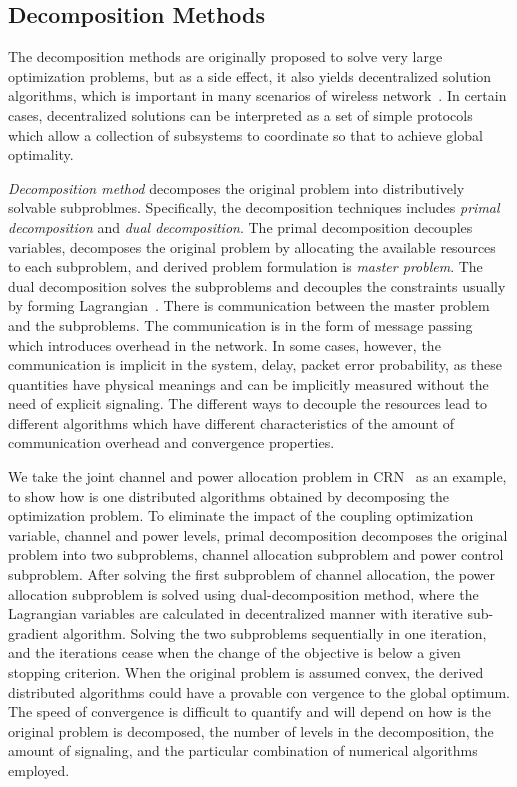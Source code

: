 \subsection{Decomposition Methods}
The decomposition methods are originally proposed to solve very large optimization problems, but as a side effect, it also yields decentralized solution algorithms, which is important in many scenarios of wireless network~\cite{boyd2007notes}. 
In certain cases, decentralized solutions can be interpreted as a set of simple protocols which allow a collection of subsystems to coordinate so that to achieve global optimality.

\textit{Decomposition method} decomposes the original problem into distributively solvable subproblmes.
Specifically, the decomposition techniques includes \textit{primal decomposition} and \textit{dual decomposition}.
The primal decomposition decouples variables, \ie decomposes the original problem by allocating the available resources to each subproblem, and derived problem formulation is \textit{master problem}.
The dual decomposition solves the subproblems and decouples the constraints usually by forming Lagrangian~\cite{Bertsekas_99, Palomar06atutorial}.
There is communication between the master problem and the subproblems.
The communication is in the form of message passing which introduces overhead in the network.
In some cases, however, the communication is implicit in the system, \eg delay, packet error probability, as these quantities have physical meanings and can be implicitly measured without the need of explicit signaling.
The different ways to decouple the resources lead to different algorithms which have different characteristics of the amount of communication overhead and convergence properties.

We take the joint channel and power allocation problem in CRN~\cite{tachwali_opt_bandwidth_power_2013} as an example, to show how is one distributed algorithms obtained by decomposing the optimization problem.
To eliminate the impact of the coupling optimization variable, \ie channel and power levels, primal decomposition decomposes the original problem into two subproblems, channel allocation subproblem and power control subproblem. 
After solving the first subproblem of channel allocation, the power allocation subproblem is solved using dual-decomposition method, where the Lagrangian variables are calculated in decentralized manner with iterative sub-gradient algorithm.
Solving the two subproblems sequentially in one iteration, and the iterations cease when the change of the objective is below a given stopping criterion.
When the original problem is assumed convex, the derived distributed algorithms could have a provable con vergence to the global optimum.
The speed of convergence is difficult to quantify and will depend on how is the original problem is decomposed, \ie the number of levels in the decomposition, the amount of signaling, and the particular combination of numerical algorithms employed.




